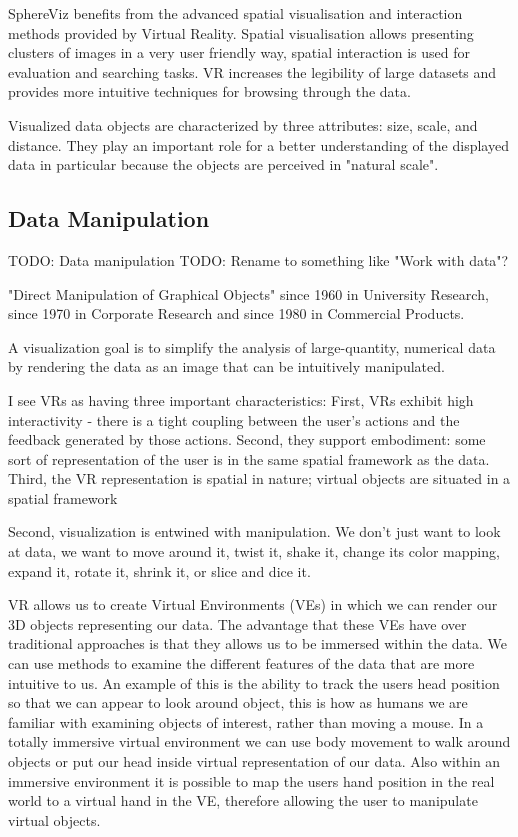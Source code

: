 SphereViz benefits from the advanced spatial visualisation and interaction methods provided by Virtual Reality. Spatial visualisation allows presenting clusters of images in a very user friendly way, spatial interaction is used for evaluation and searching tasks. VR increases the legibility of large datasets and provides more intuitive techniques for browsing through the data.
\cite{Soldati2007}

Visualized data objects are characterized by three attributes: size, scale, and distance. They play an important role for a better understanding of the displayed data in particular because the objects are perceived in "natural scale".
\cite{Soldati2007}


\subsection{Data Manipulation}

TODO: Data manipulation
TODO: Rename to something like "Work with data"?

"Direct Manipulation of Graphical Objects" since 1960 in University Research, since 1970 in Corporate Research and since 1980 in Commercial Products.
\cite{Myers1998}

A visualization goal is to simplify the analysis of large-quantity, numerical data by rendering the data as an image that can be intuitively manipulated.
\cite{Stone1994}

I see VRs as having three important characteristics: First, VRs exhibit high interactivity - there is a tight coupling between the user's actions and the feedback generated by those actions. Second, they support embodiment: some sort of representation of the user is in the same spatial framework as the data. Third, the VR representation is spatial in nature; virtual objects are situated in a spatial framework
\cite{Stone1994}

Second, visualization is entwined with manipulation. We don't just want to look at data, we want to move around it, twist it, shake it, change its color mapping, expand it, rotate it, shrink it, or slice and dice it.
\cite{Stone1994}

VR allows us to create Virtual Environments (VEs) in which we can render our 3D objects representing our data. The advantage that these VEs have over traditional approaches is that they allows us to be immersed within the data. We can use methods to examine the different features of the data that are more intuitive to us. An example of this is the ability to track the users head position so that we can appear to look around object, this is how as humans we are familiar with examining objects of interest, rather than moving a mouse. In a totally immersive virtual environment we can use body movement to walk around objects or put our head inside virtual representation of our data. Also within an immersive environment it is possible to map the users hand position in the real world to a virtual hand in the VE, therefore allowing the user to manipulate virtual objects.
\cite{Jamieson2007}

